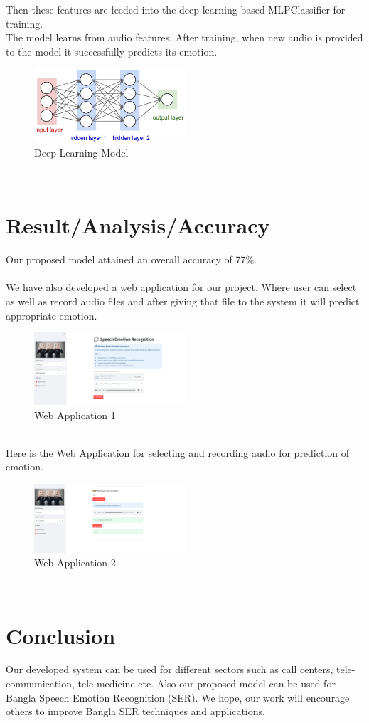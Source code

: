 \documentclass[a4paper, 12pt]{report}
\begin{document}
Then these features are feeded into the deep learning based MLPClassifier for training.\\
The model learns from audio features. After training, when new audio is provided to the model it successfully predicts its emotion.\\
\begin{figure}[h!]
\centering
\includegraphics[width=0.5\textwidth]{deep_learning}
\caption{Deep Learning Model}
\end{figure}\\

\section{Result/Analysis/Accuracy}
Our proposed model attained an overall accuracy of 77\%.\\\\
We have also developed a web application for our project. Where user can select as well as record audio files and after giving that file to the system it will predict appropriate emotion.\\
\begin{figure}[h!]
\centering
\includegraphics[width=0.5\textwidth]{webapp1}
\caption{Web Application 1}
\end{figure}\\
Here is the Web Application for selecting and recording audio for prediction of emotion.
\begin{figure}[h!]
\centering
\includegraphics[width=0.5\textwidth]{webapp2}
\caption{Web Application 2}
\end{figure}\\

\section{Conclusion}
Our developed system can be used for different sectors such as call centers, tele-communication, tele-medicine etc. Also our proposed model can be used for Bangla Speech Emotion Recognition (SER). We hope, our work will encourage others to improve Bangla SER techniques and applications.



\end{document}
